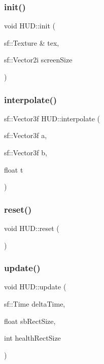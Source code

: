 \mbox{\label{class_h_u_d_abcd24489d983e367e38f1ee35e4f0cef}} 
\subsubsection{\texorpdfstring{init()}{init()}}
{\footnotesize\ttfamily void H\+U\+D\+::init (\begin{DoxyParamCaption}\item[{sf\+::\+Texture \&}]{tex,  }\item[{sf\+::\+Vector2i}]{screen\+Size }\end{DoxyParamCaption})}

\mbox{\label{class_h_u_d_aeb9ac3973c124a7e893d6c3cc9c8688f}} 
\subsubsection{\texorpdfstring{interpolate()}{interpolate()}}
{\footnotesize\ttfamily sf\+::\+Vector3f H\+U\+D\+::interpolate (\begin{DoxyParamCaption}\item[{sf\+::\+Vector3f}]{a,  }\item[{sf\+::\+Vector3f}]{b,  }\item[{float}]{t }\end{DoxyParamCaption})}

\mbox{\label{class_h_u_d_a9800d7a76e53e33264f444fd5c863bff}} 
\subsubsection{\texorpdfstring{reset()}{reset()}}
{\footnotesize\ttfamily void H\+U\+D\+::reset (\begin{DoxyParamCaption}{ }\end{DoxyParamCaption})}

\mbox{\label{class_h_u_d_a82e0269135f98973429dc257bb1c7d5a}} 
\subsubsection{\texorpdfstring{update()}{update()}}
{\footnotesize\ttfamily void H\+U\+D\+::update (\begin{DoxyParamCaption}\item[{sf\+::\+Time}]{delta\+Time,  }\item[{float}]{sb\+Rect\+Size,  }\item[{int}]{health\+Rect\+Size }\end{DoxyParamCaption})}

